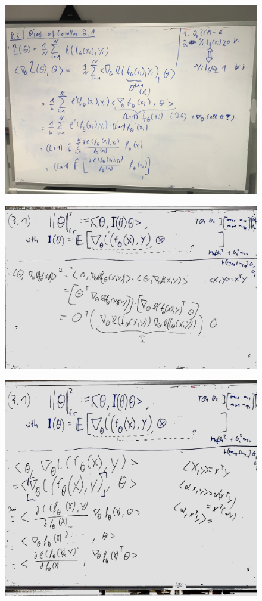 \documentclass[a4paper]{article}
\begin{document}
\begin{figure}
	\centering
\includegraphics[width=\textwidth]{whiteboard_notes/IMG_1583.jpg}
\end{figure}
\begin{figure}
	\centering
\includegraphics[width=\textwidth]{whiteboard_notes/3_1_proof.jpg}
\end{figure}
\begin{figure}
	\centering
\includegraphics[width=\textwidth]{whiteboard_notes/3_1_proof_cont.jpg}
\end{figure}
\end{document}
